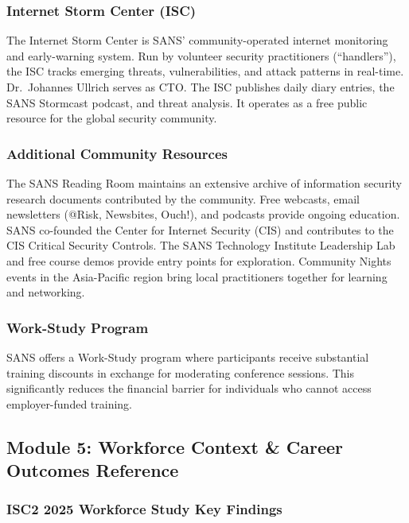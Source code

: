 \documentclass[11pt,letterpaper]{article}
\begin{document}
\subsubsection{Internet Storm Center (ISC)}

The Internet Storm Center is SANS' community-operated internet monitoring and early-warning system. Run by volunteer security practitioners (``handlers''), the ISC tracks emerging threats, vulnerabilities, and attack patterns in real-time. Dr.\ Johannes Ullrich serves as CTO. The ISC publishes daily diary entries, the SANS Stormcast podcast, and threat analysis. It operates as a free public resource for the global security community.

\subsubsection{Additional Community Resources}

The SANS Reading Room maintains an extensive archive of information security research documents contributed by the community. Free webcasts, email newsletters (@Risk, Newsbites, Ouch!), and podcasts provide ongoing education. SANS co-founded the Center for Internet Security (CIS) and contributes to the CIS Critical Security Controls. The SANS Technology Institute Leadership Lab and free course demos provide entry points for exploration. Community Nights events in the Asia-Pacific region bring local practitioners together for learning and networking.

\subsubsection{Work-Study Program}

SANS offers a Work-Study program where participants receive substantial training discounts in exchange for moderating conference sessions. This significantly reduces the financial barrier for individuals who cannot access employer-funded training.

\subsection{Module 5: Workforce Context \& Career Outcomes Reference}

\subsubsection{ISC2 2025 Workforce Study Key Findings}
\end{document}
